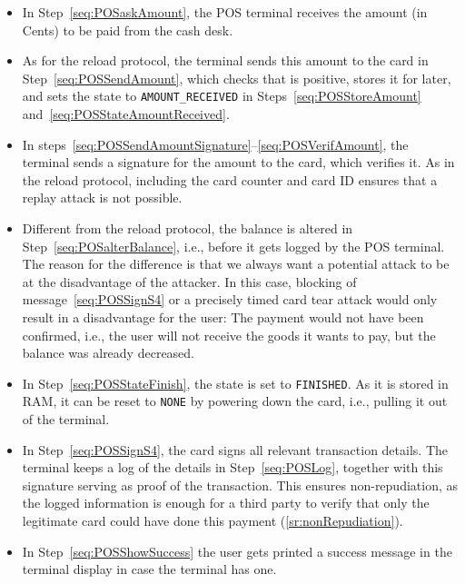 \documentclass{article}
\begin{document}
\begin{itemize}
    \item In Step~\ref{seq:POSaskAmount}, the POS terminal receives the amount (in Cents) to be paid from the cash desk.
    \item As for the reload protocol, the terminal sends this amount to the card in Step~\ref{seq:POSSendAmount}, which checks that is positive, stores it for later, and sets the state to \texttt{AMOUNT\_RECEIVED} in Steps~\ref{seq:POSStoreAmount} and~\ref{seq:POSStateAmountReceived}.

    \item In steps~\ref{seq:POSSendAmountSignature}--\ref{seq:POSVerifAmount}, the terminal sends a signature for the amount to the card, which verifies it.
          As in the reload protocol, including the card counter and card ID ensures that a replay attack is not possible.

    \item Different from the reload protocol, the balance is altered in Step~\ref{seq:POSalterBalance}, i.e., before it gets logged by the POS terminal.
          The reason for the difference is that we always want a potential attack to be at the disadvantage of the attacker.
          In this case, blocking of message~\ref{seq:POSSignS4} or a precisely timed card tear attack would only result in a disadvantage for the user:
          The payment would not have been confirmed, i.e., the user will not receive the goods it wants to pay, but the balance was already decreased.

    \item In Step~\ref{seq:POSStateFinish}, the state is set to \texttt{FINISHED}.
          As it is stored in RAM, it can be reset to \texttt{NONE} by powering down the card, i.e., pulling it out of the terminal.

    \item In Step~\ref{seq:POSSignS4}, the card signs all relevant transaction details.
          The terminal keeps a log of the details in Step~\ref{seq:POSLog}, together with this signature serving as proof of the transaction.
          This ensures non-repudiation, as the logged information is enough for a third party to verify that only the legitimate card could have done this payment (\ref{sr:nonRepudiation}).

    \item In Step~\ref{seq:POSShowSuccess} the user gets printed a success message in the terminal display in case the terminal has one.
\end{itemize}
\end{document}
